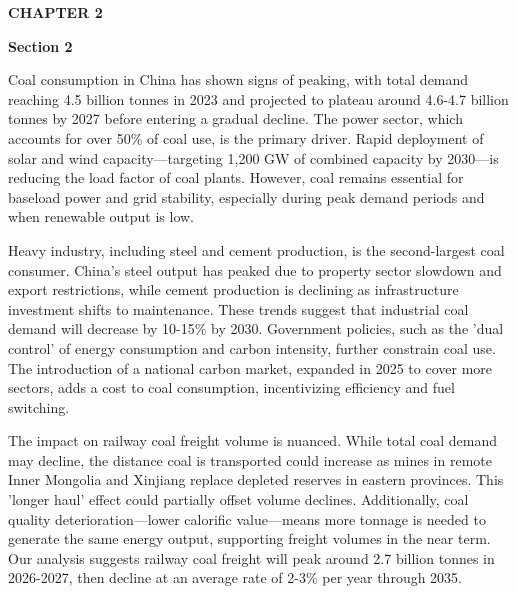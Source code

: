 \documentclass[10pt,a4paper]{article}
\begin{document}
\clearpage
{\textcolor{BOBlue}{\scriptsize\bfseries CHAPTER 2}}\par\vspace{-1pt}
{\Large\sffamily\bfseries\color{BONavy} Section 2}\par\vspace{4pt}
{\small Coal consumption in China has shown signs of peaking, with total demand reaching 4.5 billion tonnes in 2023 and projected to plateau around 4.6-4.7 billion tonnes by 2027 before entering a gradual decline. The power sector, which accounts for over 50\% of coal use, is the primary driver. Rapid deployment of solar and wind capacity—targeting 1,200 GW of combined capacity by 2030—is reducing the load factor of coal plants. However, coal remains essential for baseload power and grid stability, especially during peak demand periods and when renewable output is low.}

{\small Heavy industry, including steel and cement production, is the second-largest coal consumer. China's steel output has peaked due to property sector slowdown and export restrictions, while cement production is declining as infrastructure investment shifts to maintenance. These trends suggest that industrial coal demand will decrease by 10-15\% by 2030. Government policies, such as the 'dual control' of energy consumption and carbon intensity, further constrain coal use. The introduction of a national carbon market, expanded in 2025 to cover more sectors, adds a cost to coal consumption, incentivizing efficiency and fuel switching.}

{\small The impact on railway coal freight volume is nuanced. While total coal demand may decline, the distance coal is transported could increase as mines in remote Inner Mongolia and Xinjiang replace depleted reserves in eastern provinces. This 'longer haul' effect could partially offset volume declines. Additionally, coal quality deterioration—lower calorific value—means more tonnage is needed to generate the same energy output, supporting freight volumes in the near term. Our analysis suggests railway coal freight will peak around 2.7 billion tonnes in 2026-2027, then decline at an average rate of 2-3\% per year through 2035.}
\vspace{3pt}\noindent{}\vspace{4pt}
\end{document}
